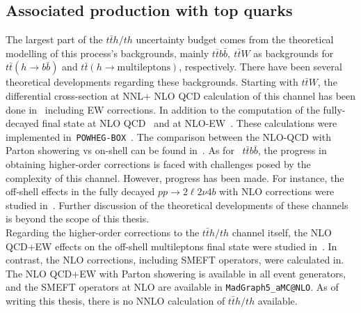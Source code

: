 \subsection{Associated production with top quarks}
The largest part of the $t\bar t h/th$ uncertainty budget comes from the theoretical modelling of this process's backgrounds, mainly $t \bar t b\bar b,\ t\bar t W$ as backgrounds for $ t\bar t (h \to b\bar b)$ and $ t \bar t ( h \to \mathrm{multileptons})$, respectively. There have been several theoretical developments regarding these backgrounds. Starting with $t\bar t W$, the differential cross-section at NNL+ NLO QCD calculation of this channel has been done in~\cite{Broggio:2019ewu,Kulesza:2020nfh} including EW corrections. In addition to the computation of the fully-decayed final state at NLO QCD~\cite{Bevilacqua:2020pzy,Denner:2020hgg,Bevilacqua:2020srb} and at NLO-EW~\cite{Denner:2021hqi}. These calculations were implemented in~\texttt{POWHEG-BOX}~\cite{Cordero:2021iau}. The comparison between the NLO-QCD with Parton showering vs on-shell can be found in~\cite{Bevilacqua:2021tzp}. As for ~$t \bar t b\bar b$, the progress in obtaining higher-order corrections is faced with challenges posed by the complexity of this channel. However, progress has been made. For instance, the off-shell effects in the fully decayed $ pp \to 2 \ell 2 \nu  4 b$ with NLO corrections were studied in~\cite{Denner:2020orv, Bevilacqua:2021cit}. Further discussion of the theoretical developments of these channels is beyond the scope of this thesis. \\
Regarding the higher-order corrections to the $t\bar t h /t h$ channel itself, the NLO QCD+EW effects on the off-shell multileptons final state were studied in~\cite{Denner:2019zdz}. In contrast, the NLO corrections, including SMEFT operators, were calculated in\cite{Maltoni:2016yxb}. The NLO QCD+EW with Parton showering is available in all event generators, and the SMEFT operators at NLO are available in \texttt{MadGraph5\_aMC@NLO}.  As of writing this thesis, there is no NNLO calculation of $t\bar t h /t h$ available. 

